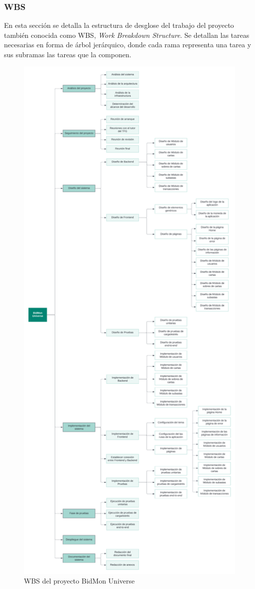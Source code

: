 \subsubsection{WBS}
En esta sección se detalla la estructura de desglose del trabajo del proyecto también conocida como WBS, \textit{Work Breakdown Structure}. 
Se detallan las tareas necesarias en forma de árbol jerárquico, donde cada rama representa una tarea y sus subramas las tareas que la componen. 
\begin{figure}[H]
    \hypertarget{fig:WBS}{}
    \centering
    \includegraphics[width=0.5\linewidth]{figures/5_WBS.png}
    \caption{WBS del proyecto BidMon Universe}
    \label{fig:WBS}
\end{figure}